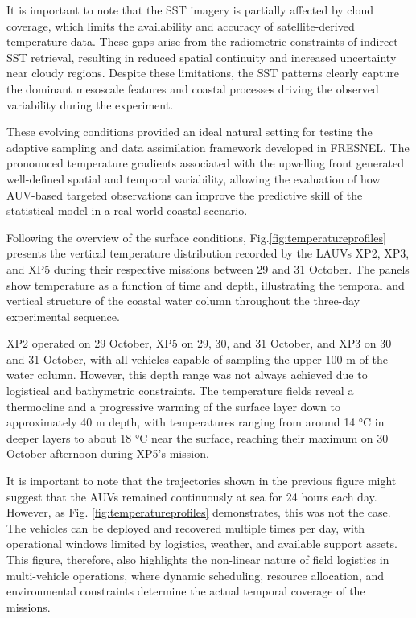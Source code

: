 It is important to note that the SST imagery is partially affected by
cloud coverage, which limits the availability and accuracy of
satellite-derived temperature data. These gaps arise from the
radiometric constraints of indirect SST retrieval, resulting in reduced
spatial continuity and increased uncertainty near cloudy regions.
Despite these limitations, the SST patterns clearly capture the dominant
mesoscale features and coastal processes driving the observed
variability during the experiment.

These evolving conditions provided an ideal natural setting for testing
the adaptive sampling and data assimilation framework developed in
FRESNEL. The pronounced temperature gradients associated with the
upwelling front generated well-defined spatial and temporal variability,
allowing the evaluation of how AUV-based targeted observations can
improve the predictive skill of the statistical model in a real-world
coastal scenario.

Following the overview of the surface conditions,
Fig.\ref{fig:temperatureprofiles} presents the vertical temperature
distribution recorded by the LAUVs XP2, XP3, and XP5 during their
respective missions between 29 and 31 October. The panels show
temperature as a function of time and depth, illustrating the temporal
and vertical structure of the coastal water column throughout the
three-day experimental sequence.

XP2 operated on 29 October, XP5 on 29, 30, and 31 October, and XP3 on 30
and 31 October, with all vehicles capable of sampling the upper 100 m of
the water column. However, this depth range was not always achieved due
to logistical and bathymetric constraints. The temperature fields reveal
a thermocline and a progressive warming of the surface layer down to
approximately 40 m depth, with temperatures ranging from around 14 °C in
deeper layers to about 18 °C near the surface, reaching their maximum on
30 October afternoon during XP5’s mission.

It is important to note that the trajectories shown in the previous
figure might suggest that the AUVs remained continuously at sea for 24
hours each day. However, as Fig. \ref{fig:temperatureprofiles}
demonstrates, this was not the case. The vehicles can be deployed and
recovered multiple times per day, with operational windows limited by
logistics, weather, and available support assets. This figure,
therefore, also highlights the non-linear nature of field logistics in
multi-vehicle operations, where dynamic scheduling, resource allocation,
and environmental constraints determine the actual temporal coverage of
the missions.

